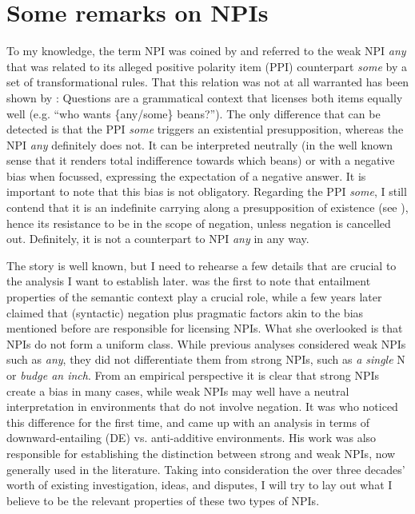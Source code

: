 \documentclass[output=paper,colorlinks,citecolor=brown,
]{langscibook}
\begin{document}
\section{Some remarks on NPIs}

To my knowledge, the term NPI was coined by \citet{klima1964} and referred to the weak NPI \textit{any} that was related to
its alleged positive polarity item (PPI) counterpart \textit{some} by a set of transformational rules. That this
relation was not at all warranted has been shown by \citet{lakoffrob1969}: Questions are a grammatical context that
licenses both items equally well (e.g. ``who wants \{any/some\} beans?''). The only difference that can be detected is
that the PPI \textit{some} triggers an existential presupposition, whereas the NPI \textit{any} definitely does not. It
can be interpreted neutrally (in the well known sense that it renders total indifference towards which beans) or with a
negative bias when focussed, expressing the expectation of a negative answer. It is important to note that this bias is not
obligatory. Regarding the PPI \textit{some}, I still contend that it is an indefinite carrying along a presupposition
of existence (see \citealt{neubarth2006}), hence its resistance to be in the scope of negation, unless negation
is cancelled out. Definitely, it is not a counterpart to NPI \textit{any} in any way.

The story is well known, but I need to rehearse a few details that
are crucial to the analysis I want to establish later. \citet{ladusaw1979} was the first to note that entailment properties of the semantic context play a
crucial role, while a few years later \citet{linebarger1987} claimed that (syntactic) negation plus pragmatic
factors akin to the bias mentioned before are responsible for licensing NPIs. What she overlooked is that NPIs do not form a uniform class. While previous analyses considered weak NPIs such as \textit{any}, they did not differentiate them from strong NPIs, such as \textit{a single} N or \textit{budge an inch}. From an empirical perspective it is clear that strong NPIs create a bias in many cases, while weak NPIs may well have a neutral interpretation in environments that do not involve negation. It was \citet{heim1984} who noticed this
difference for the first time, and \citet{zwarts1990, zwarts1998} came up with an analysis in terms of
downward-entailing (DE) vs. anti-additive environments. His work was also responsible for establishing the distinction
between strong and weak NPIs, now generally used in the literature. Taking into consideration the over three decades' worth of existing investigation, ideas, and disputes, I
will try to lay out what I believe to be the relevant properties of these two types of NPIs.
\end{document}
